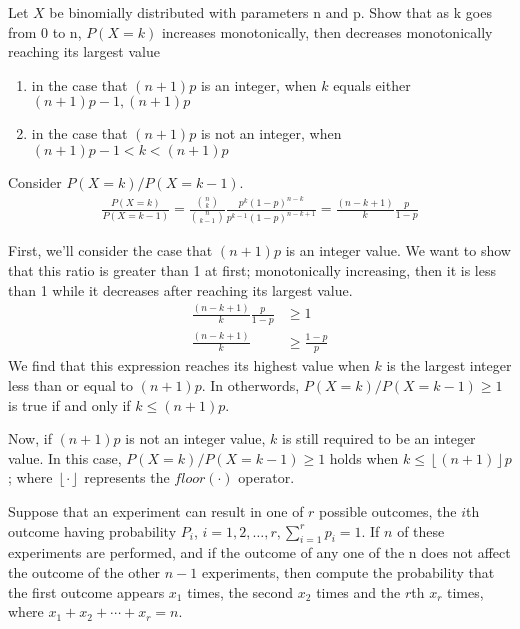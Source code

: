 \documentclass{article}
\begin{document}
    \makemytitle

    \nextproblem
    \nextproblem

    \begin{problem}
        Let $X$ be binomially distributed with parameters n and p. Show that as k goes from 0 to n, $P (X = k)$ increases monotonically, then decreases monotonically reaching its largest value 
        \begin{enumerate}[label=(\alph*)]
            \item in the case that $(n+1)p$ is an integer, when $k$ equals either $(n+1)p-1, (n+1)p$
            \item in the case that $(n+1)p$ is not an integer, when $(n+1)p-1<k<(n+1)p$
        \end{enumerate}
    \end{problem}

    \begin{solution}
        Consider $P(X = k) / P(X = k - 1)$.
        \begin{align*}
            \frac{P(X = k)} { P(X = k - 1)} = \frac{\binom{n}{k}}{\binom{n}{k - 1}} \frac{p^k (1-p)^{n-k}} {p^{k-1} (1-p)^{n-k+1}} = \frac{(n - k + 1)}{k} \frac{p} {1-p}
        \end{align*}

        First, we'll consider the case that $(n+1)p$ is an integer value. We want to show that this ratio is greater than 1 at first; monotonically increasing, then it is less than 1 while it decreases after reaching its largest value.
        \begin{align*}
            \frac{(n - k + 1)}{k} \frac{p} {1-p} &\geq 1 \\
            \frac{(n - k + 1)}{k} &\geq \frac {1-p} {p}
        \end{align*}
        We find that this expression reaches its highest value when $k$ is the largest integer less than or equal to $(n+1)p$. In otherwords, $P(X = k) / P(X = k - 1) \geq 1$ is true if and only if $k \leq (n+1)p$.

        Now, if $(n+1)p$ is not an integer value, $k$ is still required to be an integer value. In this case, $P(X = k) / P(X = k - 1) \geq 1$ holds when $k \leq \left\lfloor{(n + 1)} \right \rfloor p$; where $\left \lfloor \cdot \right\rfloor$ represents the $floor(\cdot)$ operator.
    \end{solution}


    \nextproblem
    \nextproblem
    \begin{problem}
        Suppose that an experiment can result in one of $r$ possible outcomes, the $i$th outcome having probability $P_i$, $i = 1, 2, \ldots, r, \sum_{i=1}^r p_i = 1$. If $n$ of these experiments are performed, and if the outcome of any one of the n does not affect the outcome of the other $n - 1$ experiments, then compute the probability that the first outcome appears $x_1$ times, the second $x_2$ times and the $r$th $x_r$ times, where $x_1+x_2+\cdots+x_r =n$.
    \end{problem}
\end{document}
